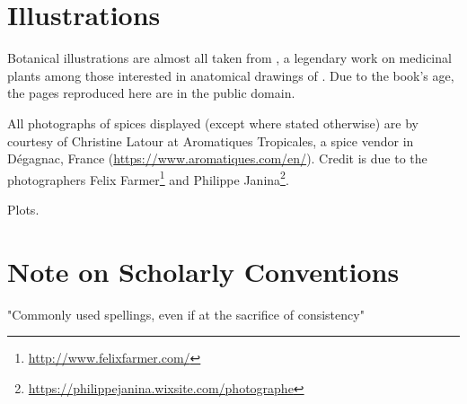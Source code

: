



\section{Illustrations}

Botanical illustrations are almost all taken from \textcite{kohler_kohlers_1887}, a legendary work on medicinal plants among those interested in anatomical drawings of . Due to the book's age, the pages reproduced here are in the public domain. %

All photographs of spices displayed (except where stated otherwise) are by courtesy of Christine Latour at Aromatiques Tropicales, a spice vendor in Dégagnac, France (\url{https://www.aromatiques.com/en/}). Credit is due to the photographers Felix Farmer\footnote{\url{http://www.felixfarmer.com/}} and Philippe Janina\footnote{\url{https://philippejanina.wixsite.com/photographe}}.

Plots.

\section{Note on Scholarly Conventions}

"Commonly used spellings, even if at the sacrifice of consistency"